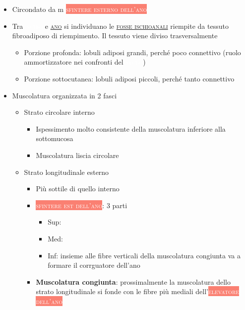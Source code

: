 \documentclass[italian,]{article}
\providecommand{\tightlist}{%
  \setlength{\itemsep}{0pt}\setlength{\parskip}{0pt}}
\newcommand{\mus}[1]{\colorbox{Salmon}{\textcolor{white}{\textsc{#1}}}}
\newcommand{\oss}[1]{\colorbox{ossa}{\textcolor{white}{\textsc{#1}}}}
\renewcommand{\a}[1]{\underline{\textsc{#1}}}
\begin{document}
\begin{itemize}
\tightlist
\item
  Circondato da m \mus{sfintere esterno dell'ano}
\item
  Tra \oss{ischio} e \a{ano} si individuano le \a{fosse ischioanali}
  riempite da tessuto fibroadiposo di riempimento. Il tessuto viene
  diviso trasversalmente

  \begin{itemize}
  \tightlist
  \item
    Porzione profonda: lobuli adiposi grandi, perché poco connettivo
    (ruolo ammortizzatore nei confronti del \oss{sacro})
  \item
    Porzione sottocutanea: lobuli adiposi piccoli, perché tanto
    connettivo
  \end{itemize}
\item
  Muscolatura organizzata in 2 fasci

  \begin{itemize}
  \tightlist
  \item
    Strato circolare interno

    \begin{itemize}
    \tightlist
    \item
      Ispessimento molto consistente della muscolatura inferiore alla
      sottomucosa
    \item
      Muscolatura liscia circolare
    \end{itemize}
  \item
    Strato longitudinale esterno

    \begin{itemize}
    \tightlist
    \item
      Più sottile di quello interno
    \item
      \mus{sfintere est dell'ano}: 3 parti

      \begin{itemize}
      \tightlist
      \item
        Sup:
      \item
        Med:
      \item
        Inf: insieme alle fibre verticali della muscolatura congiunta va
        a formare il corrguatore dell'ano
      \end{itemize}
    \item
      \textbf{Muscolatura congiunta}: prossimalmente la muscolatura
      dello strato longitudinale si fonde con le fibre più mediali
      dell'\mus{elevatore dell'ano}


\end{itemize}
\end{itemize}
\end{itemize}
\end{document}
